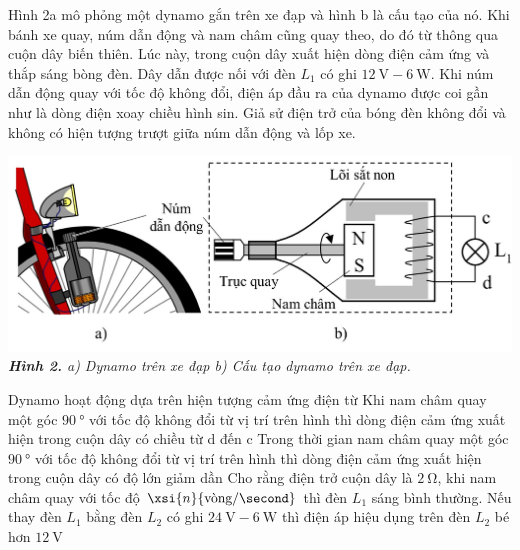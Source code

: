 \begin{ex}
	Hình 2a mô phỏng một dynamo gắn trên xe đạp và hình b là cấu tạo của nó. Khi bánh xe quay, núm dẫn động và nam châm cũng quay theo, do đó từ thông qua cuộn dây biến thiên. Lúc này, trong cuộn dây xuất hiện dòng điện cảm ứng và thắp sáng bòng đèn. Dây dẫn được nối với đèn $L_1$ có ghi $\SI{12}{\volt}-\SI{6}{\watt}$. Khi núm dẫn động quay với tốc độ không đổi, điện áp đầu ra của dynamo được coi gần như là dòng điện xoay chiều hình sin. Giả sử điện trở của bóng đèn không đổi và không có hiện tượng trượt giữa núm dẫn động và lốp xe.
	\begin{center}
		\includegraphics[scale=0.4]{../figs/THPTQG-001-2}\\
		\textit{\textbf{Hình 2.} a) Dynamo trên xe đạp b) Cấu tạo dynamo trên xe đạp.}
	\end{center}
	\choiceTF
	{\True Dynamo hoạt động dựa trên hiện tượng cảm ứng điện từ}
	{\True Khi nam châm quay một góc $\SI{90}{\degree}$ với tốc độ không đổi từ vị trí trên hình thì dòng điện cảm ứng xuất hiện trong cuộn dây có chiều từ d đến c}
	{Trong thời gian nam châm quay một góc $\SI{90}{\degree}$ với tốc độ không đổi từ vị trí trên hình thì dòng điện cảm ứng xuất hiện trong cuộn dây có độ lớn giảm dần}
	{Cho rằng điện trở cuộn dây là $\SI{2}{\ohm}$, khi nam châm quay với tốc độ $\xsi{n}{\text{vòng}/\second}$ thì đèn $L_1$ sáng bình thường. Nếu thay đèn $L_1$ bằng đèn $L_2$ có ghi $\SI{24}{\volt}-\SI{6}{\watt}$ thì điện áp hiệu dụng trên đèn $L_2$ bé hơn $\SI{12}{\volt}$}
	\loigiai{}
\end{ex}

